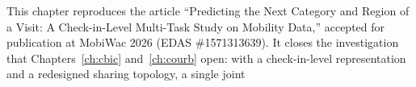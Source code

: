 \begin{chapterpreface}
This chapter reproduces the article ``Predicting the Next Category and Region of a
Visit: A Check-in-Level Multi-Task Study on Mobility Data,'' accepted for publication
at MobiWac 2026 (EDAS \#1571313639). It closes the
investigation that Chapters~\ref{ch:cbic} and~\ref{ch:courb} open: with a
check-in-level representation and a redesigned sharing topology, a single joint

\end{chapterpreface}
